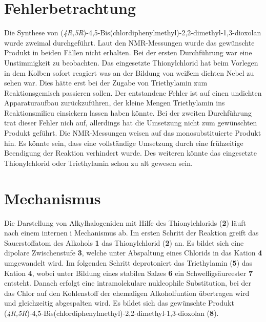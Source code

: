 \documentclass[12pt]{article}
\begin{document}
\begin{onehalfspace}
\section{Fehlerbetrachtung}

Die Synthese von (\textit{4R,5R})-4,5-Bis(chlordiphenylmethyl)-2,2-dimethyl-1,3-dioxolan wurde zweimal durchgeführt. 
Laut den NMR-Messungen wurde das gewünschte Produkt in beiden Fällen nicht erhalten.
Bei der ersten Durchführung war eine Unstimmigkeit zu beobachten. 
Das eingesetzte Thionylchlorid hat beim Vorlegen in dem Kolben sofort reagiert was an der Bildung von weißem dichten Nebel zu sehen war. Dies hätte erst bei der Zugabe von Triethylamin zum Reaktionsgemisch passieren sollen. Der entstandene Fehler ist auf einen undichten Apparaturaufbau zurückzuführen, der kleine Mengen Triethylamin ins Reaktionsmilieu einsickern lassen haben könnte. 
Bei der zweiten Durchführung trat dieser Fehler nich auf, allerdings hat die Umsetzung nicht zum gewünschten Produkt geführt.
Die NMR-Messungen weisen auf das monosubstituierte Produkt hin. Es könnte sein, dass eine vollständige Umsetzung durch eine frühzeitige Beendigung der Reaktion verhindert wurde. Des weiteren könnte das eingesetzte Thionylchlorid oder Triethylamin schon zu alt gewesen sein.

\section{Mechanismus\cite{organikum}}
Die Darstellung von Alkylhalogeniden mit Hilfe des Thionylchlorids (\textbf{2}) läuft nach einem internen i Mechanismus ab.
Im ersten Schritt der Reaktion greift das Sauerstoffatom des Alkohols \textbf{1} das Thionylchlorid (\textbf{2}) an. Es bildet sich eine dipolare Zwischenstufe \textbf{3}, welche unter Abspaltung eines Chlorids in das Kation \textbf{4} umgewandelt wird. Im folgenden Schritt deprotoniert das Triethylamin (\textbf{5}) das Kation \textbf{4}, wobei unter Bildung eines stabilen Salzes \textbf{6} ein Schwefligsäureester \textbf{7} entsteht. 
Danach erfolgt eine intramolekulare nukleophile Substitution, bei der das Chlor auf den Kohlenstoff der ehemaligen Alkoholfuntion übertragen wird und gleichzeitig  abgespalten wird. Es bildet sich  das gewünschte Produkt (\textit{4R,5R})-4,5-Bis(chlordiphenylmethyl)-2,2-dimethyl-1,3-dioxolan (\textbf{8}).\\


\end{onehalfspace}
\end{document}
